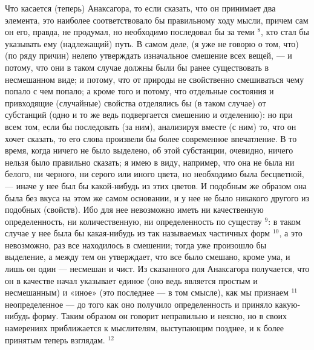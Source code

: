 \documentclass[oneside, 17pt, dvipsnames]{extbook}
\begin{document}
Что касается (теперь) Анаксагора, то если сказать, что он принимает два элемента, это наиболее соответствовало бы правильному ходу мысли, причем сам он его, правда, не продумал, но необходимо последовал бы за теми $^8$, кто стал бы указывать ему (надлежащий) путь. В самом деле, (я уже не говорю о том, что) (по ряду причин) нелепо утверждать изначальное смешение всех вещей, — и потому, что они в таком случае должны были бы ранее существовать в несмешанном виде; и потому, что от природы не свойственно смешиваться чему попало с чем попало; а кроме того и потому, что отдельные состояния и привходящие (случайные) свойства отделялись бы (в таком случае) от субстанций (одно и то же ведь подвергается смешению и отделению): но при всем том, если бы последовать (за ним), анализируя вместе (с ним) то, что он хочет сказать, то его слова произвели бы более современное впечатление. В то время, когда ничего не было выделено, об этой субстанции, очевидно, ничего нельзя было правильно сказать; я имею в виду, например, что она не была ни белого, ни черного, ни серого или иного цвета, но необходимо была бесцветной, — иначе у нее был бы какой-нибудь из этих цветов. И подобным же образом она была без вкуса на этом же самом основании, и у нее не было никакого другого из подобных (свойств). Ибо для нее невозможно иметь ни качественную определенность, ни количественную, ни определенность по существу $^9$: в таком случае у нее была бы какая-нибудь из так называемых частичных форм $^{10}$, а это невозможно, раз все находилось в смешении; тогда уже произошло бы выделение, а между тем он утверждает, что все было смешано, кроме ума, и лишь он один — несмешан и чист. Из сказанного для Анаксагора получается, что он в качестве начал указывает единое (оно ведь является простым и несмешанным) и «иное» (это последнее — в том смысле), как мы признаем $^{11}$ неопределенное — до того как оно получило определенность и приняло какую-нибудь форму. Таким образом он говорит неправильно и неясно, но в своих намерениях приближается к мыслителям, выступающим позднее, и к более принятым теперь взглядам. $^{12}$
\end{document}
